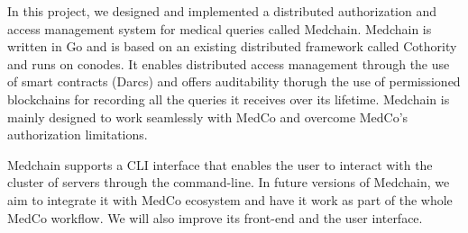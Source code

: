 In this project, we designed and implemented a distributed authorization and access management system for medical queries called Medchain. Medchain is written in Go and is based on an existing distributed framework called Cothority and runs on conodes. It enables distributed access management through the use of smart contracts (Darcs) and offers auditability thorugh the use of permissioned blockchains for recording all the queries it receives over its lifetime. Medchain is mainly designed to work seamlessly with MedCo and overcome MedCo's authorization limitations.

Medchain supports a CLI interface that enables the user to interact with the cluster of servers through the command-line. In future versions of Medchain, we aim to integrate it with MedCo ecosystem and have it work as part of the whole MedCo workflow. We will also improve its front-end and the user interface.    